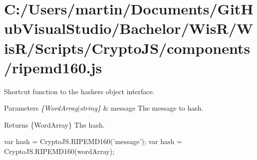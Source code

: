 \hypertarget{_c_1_2_users_2martin_2_documents_2_git_hub_visual_studio_2_bachelor_2_wis_r_2_wis_r_2_scripts_2_6d6da44472d2f8d05f238172bf4c2766}{}\section{C\+:/\+Users/martin/\+Documents/\+Git\+Hub\+Visual\+Studio/\+Bachelor/\+Wis\+R/\+Wis\+R/\+Scripts/\+Crypto\+J\+S/components/ripemd160.\+js}
Shortcut function to the hasher\textquotesingle{}s object interface.


\begin{DoxyParams}{Parameters}
{\em \{\+Word\+Array$\vert$string\}} & message The message to hash.\\
\hline
\end{DoxyParams}
\begin{DoxyReturn}{Returns}
\{Word\+Array\} The hash.
\end{DoxyReturn}
\begin{DoxyVerb}var hash = CryptoJS.RIPEMD160('message');
var hash = CryptoJS.RIPEMD160(wordArray);\end{DoxyVerb}



